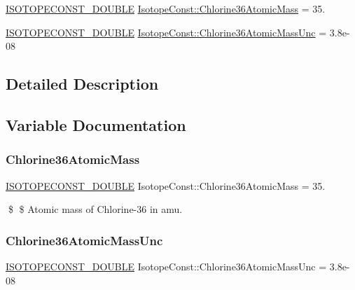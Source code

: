 \begin{DoxyCompactItemize}
\item 
\mbox{\hyperlink{group___isotope_const-_macros_ga8f45a7272ce02c0b4c65c44636ed719a}{I\+S\+O\+T\+O\+P\+E\+C\+O\+N\+S\+T\+\_\+\+D\+O\+U\+B\+LE}} \mbox{\hyperlink{group___isotope_const-_chlorine-_cl36_ga9eb58cab976f3ea3b4ab41d13ffbec5c}{Isotope\+Const\+::\+Chlorine36\+Atomic\+Mass}} = 35.
\item 
\mbox{\hyperlink{group___isotope_const-_macros_ga8f45a7272ce02c0b4c65c44636ed719a}{I\+S\+O\+T\+O\+P\+E\+C\+O\+N\+S\+T\+\_\+\+D\+O\+U\+B\+LE}} \mbox{\hyperlink{group___isotope_const-_chlorine-_cl36_gaad245057b869dad6059abe12295432c3}{Isotope\+Const\+::\+Chlorine36\+Atomic\+Mass\+Unc}} = 3.\+8e-\/08
\end{DoxyCompactItemize}


\subsection{Detailed Description}


\subsection{Variable Documentation}
\mbox{\label{group___isotope_const-_chlorine-_cl36_ga9eb58cab976f3ea3b4ab41d13ffbec5c}} 
\subsubsection{\texorpdfstring{Chlorine36\+Atomic\+Mass}{Chlorine36AtomicMass}}
{\footnotesize\ttfamily \mbox{\hyperlink{group___isotope_const-_macros_ga8f45a7272ce02c0b4c65c44636ed719a}{I\+S\+O\+T\+O\+P\+E\+C\+O\+N\+S\+T\+\_\+\+D\+O\+U\+B\+LE}} Isotope\+Const\+::\+Chlorine36\+Atomic\+Mass = 35.}

\$ \$ Atomic mass of Chlorine-\/36 in amu. \mbox{\label{group___isotope_const-_chlorine-_cl36_gaad245057b869dad6059abe12295432c3}} 
\subsubsection{\texorpdfstring{Chlorine36\+Atomic\+Mass\+Unc}{Chlorine36AtomicMassUnc}}
{\footnotesize\ttfamily \mbox{\hyperlink{group___isotope_const-_macros_ga8f45a7272ce02c0b4c65c44636ed719a}{I\+S\+O\+T\+O\+P\+E\+C\+O\+N\+S\+T\+\_\+\+D\+O\+U\+B\+LE}} Isotope\+Const\+::\+Chlorine36\+Atomic\+Mass\+Unc = 3.\+8e-\/08}

